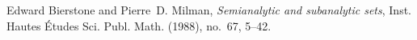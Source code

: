 \documentclass[12pt]{article}
\theoremstyle{theorem}
\theoremstyle{definition}
\theoremstyle{remark}
\begin{document}
\begin{thebibliography}{9}
Edward Bierstone and Pierre~D. Milman, \emph{Semianalytic and subanalytic
  sets}, Inst. Hautes \'Etudes Sci. Publ. Math. (1988), no.~67, 5--42.
\end{thebibliography}

\end{document}
